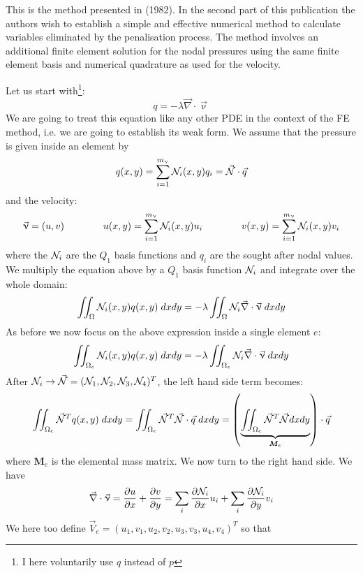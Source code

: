 This is the method presented in \textcite{zina82} (1982). In the second part 
of this publication the authors wish to establish a simple and effective 
numerical method to calculate variables eliminated by the penalisation process. 
The method involves an additional finite element solution for the nodal 
pressures using the same finite element basis and numerical quadrature 
as used for the velocity.

Let us start with\footnote{I here voluntarily use $q$ instead of $p$}:
\[
q = -\lambda \vec\nabla\cdot \vec\upnu
\]
We are going to treat this equation like any other PDE in the context 
of the FE method, i.e. we are going to establish its weak form. 
We assume that the pressure is given inside an element by
\[
q(x,y) = \sum_{i=1}^{m_\upnu} {\mathcal{N}}_i(x,y) q_i = \vec{{\mathcal{N}}} \cdot \vec{q}
\]
and the velocity:
\[
\vec\upnu = (u,v) 
\qquad 
\qquad 
u(x,y)  = \sum_{i=1}^{m_\upnu} {\mathcal{N}}_i(x,y) u_i
\qquad 
\qquad 
v(x,y)  = \sum_{i=1}^{m_\upnu} {\mathcal{N}}_i(x,y) v_i
\]
where the ${\mathcal{N}}_i$ are the $Q_1$ basis functions and $q_i$ are the sought after nodal values. 
We multiply the equation above by a $Q_1$ basis function ${\mathcal{N}}_i$ and integrate over the whole domain:
\[
\iint_\Omega {\mathcal{N}}_i(x,y) q(x,y) \; dxdy 
= -\lambda \iint_\Omega {\mathcal{N}}_i \vec\nabla\cdot \vec\upnu  \; dx dy
\]
As before we now focus on the above expression inside a single element $e$:
\[
\iint_{\Omega_e} {\mathcal{N}}_i(x,y) q(x,y) \; dxdy = -\lambda \iint_{\Omega_e} {\mathcal{N}}_i \vec\nabla\cdot \vec\upnu \; dx dy
\]
After ${\mathcal{N}}_i \rightarrow \vec{{\mathcal{N}}}=({\mathcal{N}}_1,{\mathcal{N}}_2,{\mathcal{N}}_3,{\mathcal{N}}_4)^T$, the left hand side term becomes:
\[
\iint _{\Omega_e} \vec{{\mathcal{N}}}^T q(x,y) \; dxdy 
=
\iint _{\Omega_e} \vec{{\mathcal{N}}}^T \vec{{\mathcal{N}}} \cdot \vec{q} \; dxdy 
=
\left(\underbrace{\iint _{\Omega_e} \vec{{\mathcal{N}}}^T \vec{{\mathcal{N}}} dxdy}_{{\bm M}_e} \right) \cdot \vec{q}  
\]
where ${\bm M}_e$ is the elemental mass matrix.
We now turn to the right hand side. We have
\[
\vec\nabla\cdot \vec\upnu
= \frac{\partial u}{\partial x}+\frac{\partial v}{\partial y}
= \sum_i \frac{\partial {\mathcal{N}}_i}{\partial x} u_i + \sum_i \frac{\partial {\mathcal{N}}_i}{\partial y} v_i 
\]
We here too define $\vec{V}_e=(u_1,v_1,u_2,v_2,u_3,v_3,u_4,v_4)^T$ so that 

